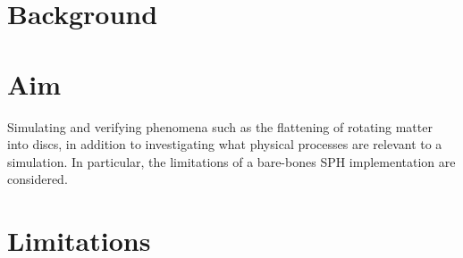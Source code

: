 \documentclass[../main.tex]{subfiles}
\begin{document}
\section{Background}

\section{Aim}
Simulating and verifying phenomena such as the flattening of rotating matter into discs, in addition
to investigating what physical processes are relevant to a simulation. In particular, the
limitations of a bare-bones SPH implementation are considered.

\section{Limitations}
\end{document}
